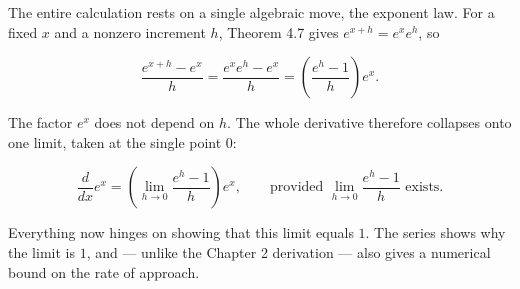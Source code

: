 \documentclass[a4paper,12pt,oneside]{memoir}
\begin{document}
The entire calculation rests on a single algebraic move, the exponent law. For a fixed \(x\) and a nonzero increment \(h\), Theorem 4.7 gives \(e^{x + h} = e^{x} e^{h}\), so

\[ \frac{e^{x + h} - e^{x}}{h} = \frac{e^{x} e^{h} - e^{x}}{h} = \left( \frac{e^{h} - 1}{h} \right) e^{x}. \]

The factor \(e^{x}\) does not depend on \(h\). The whole derivative therefore collapses onto one limit, taken at the single point \(0\):

\[ \frac{d}{dx} e^{x} = \left( \lim_{h \to 0} \frac{e^{h} - 1}{h} \right) e^{x}, \qquad \text{provided } \lim_{h \to 0} \frac{e^{h} - 1}{h} \text{ exists.} \]

Everything now hinges on showing that this limit equals \(1\). The series shows why the limit is \(1\), and — unlike the Chapter 2 derivation — also gives a numerical bound on the rate of approach.
\end{document}
